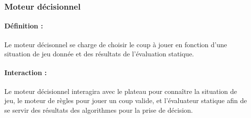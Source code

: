 \documentclass[12pt]{article}
\begin{document}
			\subsubsection{Moteur décisionnel}

				\paragraph{Définition :}

				Le moteur décisonnel se charge de choisir le coup à jouer en fonction d'une situation de jeu donnée et des résultats de l'évaluation statique.

				\paragraph{Interaction :}

				Le moteur décisionnel interagira avec le plateau pour connaître la situation de jeu, le moteur de règles pour jouer un coup valide, et l'évaluateur statique afin de se servir des résultats des algorithmes pour la prise de décision.
\end{document}
